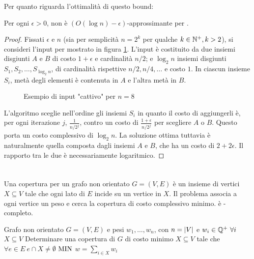 Per quanto riguarda l'ottimalità di questo bound:
\begin{theorem}
	Per ogni $\epsilon>0$, \GreedySetCover non è $(O(\log n)-\epsilon)$-approssimante per \MinSetCover.
\end{theorem}
\begin{proof}
	Fissati $\epsilon$ e $n$ (sia per semplicità $n=2^k$ per qualche $k\in\mathbb N^+,k>2$), si consideri l'input per \MinSetCover mostrato in figura \ref{fig:setcover_tightness}.
	L'input è costituito da due insiemi disgiunti $A$ e $B$ di costo $1+\epsilon$ e cardinalità $n/2$; e $\log_2 n$ insiemi disgiunti $S_1,S_2,\dots,S_{\log_2 n}$, di cardinalità rispettive $n/2,n/4,\dots$ e costo $1$. In ciascun insieme $S_i$, metà degli elementi è contenuta in $A$ e l'altra metà in $B$.

	\begin{figure}[ht]
		\centering
		
		\caption{Esempio di input "cattivo" per $n=8$}
		\label{fig:setcover_tightness}
	\end{figure}

	L'algoritmo sceglie nell'ordine gli insiemi $S_i$ in quanto il costo di aggiungerli è, per ogni iterazione $j$, $\frac{1}{n/2^j}$, contro un costo di $\frac{1+\epsilon}{n/2^j}$ per scegliere $A$ o $B$.
	Questo porta un costo complessivo di $\log_2 n$. La soluzione ottima tuttavia è naturalmente quella composta dagli insiemi $A$ e $B$, che ha un costo di $2+2\epsilon$. Il rapporto tra le due è necessariamente logaritmico.
\end{proof}



\section{\VertexCover}
Una copertura per un grafo non orientato $G=(V,E)$ è un insieme di vertici $X\subseteq V$ tale che ogni lato di $E$ incide su un vertice in $X$.
Il problema \VertexCover associa a ogni vertice un peso e cerca la copertura di costo complessivo minimo.
\VertexCover è \NPO-completo.

\popt{\VertexCover}
{Grafo non orientato $G=(V,E)$ e pesi $w_1,\dots,w_n$, con $n=| V |$ e $w_i\in\mathbb Q^+~\forall i$}
{$X\subseteq V$}
{Determinare una copertura di $G$ di costo minimo}
{$X\subseteq V$ tale che $\forall e\in E ~ e\cap X\neq\emptyset$}
{$\mathrm{MIN}$}
{$w=\sum_{i\in X} w_i$}


